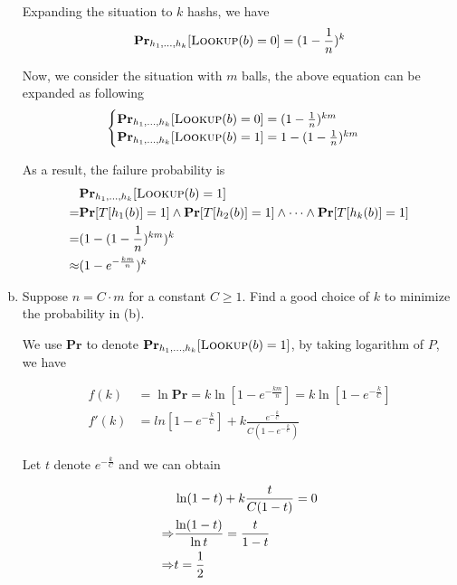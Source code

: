 \begin{problem}
\begin{enumerate}[(a)]
    Expanding the situation to $k$ hashs, we have
    \begin{equation}
        \mathbf{Pr}_{h_1 ,\dots,h_k}[\textsc{Lookup}(b) = 0]=(1-\frac{1}{n})^k
    \end{equation}

    Now, we consider the situation with $m$ balls, the above equation can be expanded as following
    \begin{equation}
        \begin{cases}
            \mathbf{Pr}_{h_1 ,\dots,h_k}[\textsc{Lookup}(b) = 0]=(1-\frac{1}{n})^{km} \\
            \mathbf{Pr}_{h_1 ,\dots,h_k}[\textsc{Lookup}(b) = 1]=1- (1-\frac{1}{n})^{km}
        \end{cases}
    \end{equation}

    As a result, the failure probability is 
    \begin{align}
        &\mathbf{Pr}_{h_1 ,\dots,h_k}[\textsc{Lookup}(b) = 1] \notag \\
        = &\mathbf{Pr}[T[h_1(b)]=1] \wedge \mathbf{Pr}[T[h_2(b)]=1] \wedge \dots \wedge \mathbf{Pr}[T[h_k(b)]=1] \notag \\
        =&(1- (1-\frac{1}{n})^{km})^k \notag \\
        \approx& (1-e^{-\frac{km}{n}})^k
    \end{align}
     
 
    \item Suppose $n=C \cdot m$ for a constant $C \ge 1$. Find a good choice of $k$ to minimize the probability in (b).
    
    \Answer
    We use $\mathbf{Pr}$ to denote $\mathbf{Pr}_{h_1 ,\dots,h_k}[\textsc{Lookup}(b) = 1]$, by taking logarithm of $P$, we have
    
    \begin{align}
        f(k)&= \ln \mathbf{Pr} = k \ln[1-e^{-\frac{km}{n}}] = k \ln[1-e^{-\frac{k}{C}}] \\
        f'(k) &= ln[1-e^{-\frac{k}{C}}] + k \frac{e^{-\frac{k}{C}}}{C(1-e^{-\frac{k}{C}})}
    \end{align}

    Let $t$ denote $e^{-\frac{k}{C}}$ and we can obtain

    \begin{align}   
        &\ln(1-t) + k \frac{t}{C(1-t)} =0 \notag\\
    \Rightarrow & \frac{\ln(1-t)}{\ln t}= \frac{t}{1-t}  \notag\\
    \Rightarrow &t=\frac{1}{2}
    \end{align}
    

\end{enumerate}
\end{problem}
